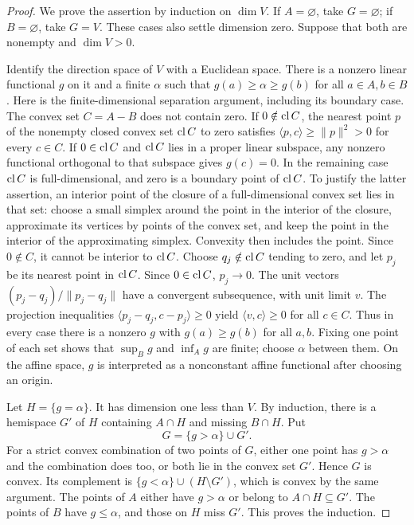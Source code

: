 \begin{proof}
We prove the assertion by induction on $\dim V$. If $A=\varnothing$,
take $G=\varnothing$; if $B=\varnothing$, take $G=V$. These cases also
settle dimension zero. Suppose that both are nonempty and $\dim V>0$.

Identify the direction space of $V$ with a Euclidean space. There is a
nonzero linear functional $g$ on it and a finite $\alpha$ such that
$g(a)\ge\alpha\ge g(b)$ for all $a\in A,b\in B$. Here is the
finite-dimensional separation argument, including its boundary case.
The convex set $C=A-B$ does not contain zero. If
$0\notin\operatorname{cl} C$, the nearest point $p$ of the nonempty closed convex set
$\operatorname{cl} C$ to zero satisfies
$\langle p,c\rangle\ge\|p\|^2>0$ for every $c\in C$.
If $0\in\operatorname{cl} C$ and $\operatorname{cl} C$ lies in a proper linear subspace, any nonzero
functional orthogonal to that subspace gives $g(c)=0$.
In the remaining case $\operatorname{cl} C$ is full-dimensional, and zero is a boundary
point of $\operatorname{cl} C$. To justify the latter assertion, an interior point of
the closure of a full-dimensional convex set lies in that set: choose a
small simplex around the point in the interior of the closure, approximate
its vertices by points of the convex set, and keep the point in the
interior of the approximating simplex. Convexity then includes the point.
Since $0\notin C$, it cannot be interior to $\operatorname{cl} C$.
Choose $q_j\notin\operatorname{cl} C$ tending to zero, and let $p_j$ be its nearest
point in $\operatorname{cl} C$. Since $0\in\operatorname{cl} C$, $p_j\to0$. The unit vectors
$(p_j-q_j)/\|p_j-q_j\|$ have a convergent subsequence, with unit limit
$v$. The projection inequalities
$\langle p_j-q_j,c-p_j\rangle\ge0$ yield
$\langle v,c\rangle\ge0$ for all $c\in C$. Thus in every case there is
a nonzero $g$ with $g(a)\ge g(b)$ for all $a,b$. Fixing one point of each
set shows that $\sup_B g$ and $\inf_A g$ are finite; choose $\alpha$
between them. On the affine space, $g$ is interpreted as a nonconstant
affine functional after choosing an origin.

Let $H=\{g=\alpha\}$. It has dimension one less than $V$. By induction,
there is a hemispace $G'$ of $H$ containing $A\cap H$ and missing
$B\cap H$. Put
\begin{equation*}
 G=\{g>\alpha\}\cup G'.
\end{equation*}
For a strict convex combination of two points of $G$, either one point
has $g>\alpha$ and the combination does too, or both lie in the convex set
$G'$. Hence $G$ is convex. Its complement is
$\{g<\alpha\}\cup(H\setminus G')$, which is convex by the same argument.
The points of $A$ either have $g>\alpha$ or belong to $A\cap H\subseteq
G'$. The points of $B$ have $g\le\alpha$, and those on $H$ miss $G'$.
This proves the induction.
\end{proof}

